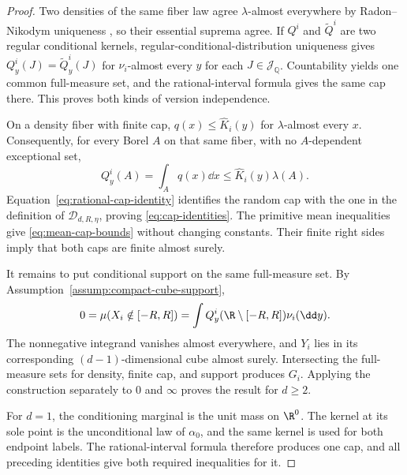 \begin{proof}
Two densities of the same fiber law agree $\lambda$-almost everywhere by
Radon--Nikodym uniqueness \cite[Theorem~3.8]{Folland1999}, so
their essential suprema agree.  If $Q^i$ and $\widetilde Q^i$ are two regular
conditional kernels, regular-conditional-distribution uniqueness
\cite[Theorem~6.3]{Kallenberg2002} gives
$Q^i_y(J)=\widetilde Q^i_y(J)$ for $\nu_i$-almost every $y$ for each
$J\in\mathscr J_{\mathbb Q}$.  Countability yields one common full-measure
set, and the rational-interval formula gives the same cap there.  This proves
both kinds of version independence.

On a density fiber with finite cap,
$q(x)\leq\widehat K_i(y)$ for $\lambda$-almost every $x$.  Consequently,
for every Borel $A$ on that same fiber, with no $A$-dependent exceptional
set,
\[
Q^i_y(A)=\int_Aq(x)\dd x
\leq\widehat K_i(y)\lambda(A).
\]
Equation~\eqref{eq:rational-cap-identity} identifies the random cap with the
one in the definition of $\mathcal D_{d,R,\eta}$, proving
\eqref{eq:cap-identities}.  The primitive mean inequalities give
\eqref{eq:mean-cap-bounds} without changing constants.  Their finite right
sides imply that both caps are finite almost surely.

It remains to put conditional support on the same full-measure set.  By
Assumption~\ref{assump:compact-cube-support},
\[
0=\mu(X_i\notin[-R,R])
=\int Q^i_y(\R\setminus[-R,R])\nu_i(\dd y).
\]
The nonnegative integrand vanishes almost everywhere, and $Y_i$ lies in its
corresponding $(d-1)$-dimensional cube almost surely.  Intersecting the
full-measure sets for density, finite cap, and support produces $G_i$.
Applying the construction separately to $0$ and $\infty$ proves the result
for $d\geq2$.

For $d=1$, the conditioning marginal is the unit mass on $\R^0$.  The kernel
at its sole point is the unconditional law of $\alpha_0$, and the same kernel
is used for both endpoint labels.  The rational-interval formula therefore
produces one cap, and all preceding identities give both required
inequalities for it.
\end{proof}

